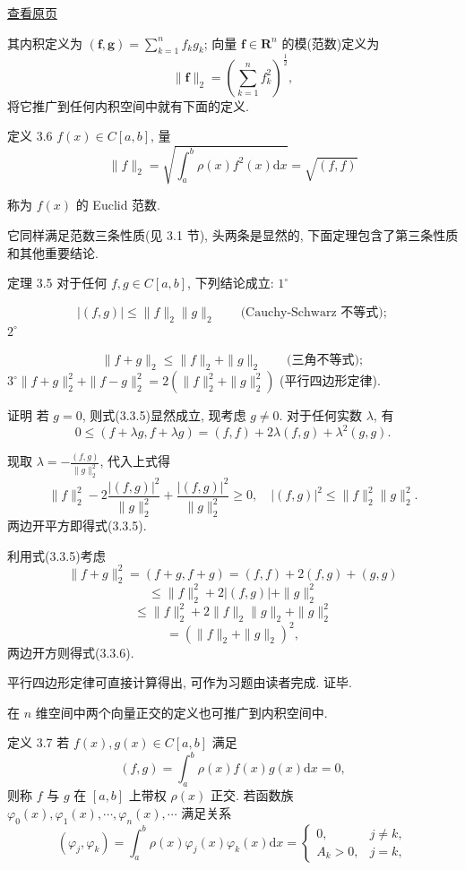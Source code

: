 \documentclass[
  10pt,
  fontset=fandol]{ctexart}
\begin{document}
\href{../../source-images/pdf-066.jpeg}{查看原页}

其内积定义为 \((\boldsymbol{f}, \boldsymbol{g}) = \sum_{k=1}^{n} f_{k} g_{k}\); 向量 \(\boldsymbol{f} \in \mathbf{R}^{n}\) 的模(范数)定义为 \[
\| \boldsymbol{f} \|_{2} = \left( \sum_{k=1}^{n} f_{k}^{2} \right)^{\frac{1}{2}},
\] 将它推广到任何内积空间中就有下面的定义.

定义 3.6 \(f(x) \in C[a, b]\), 量 \[
\| f \|_{2} = \sqrt{\int_{a}^{b} \rho(x) f^{2}(x) \mathrm{d}x} = \sqrt{(f, f)} \tag{3.3.4}
\]

称为 \(f(x)\) 的 Euclid 范数.

它同样满足范数三条性质(见 3.1 节), 头两条是显然的, 下面定理包含了第三条性质和其他重要结论.

定理 3.5 对于任何 \(f, g \in C[a, b]\), 下列结论成立: \(1^{\circ}\)

\[
|(f,g)|\leqslant\|f\|_2\|g\|_2\qquad\text{(Cauchy-Schwarz 不等式)};\tag{3.3.5}
\] \(2^{\circ}\)

\[
\|f+g\|_2\leqslant\|f\|_2+\|g\|_2\qquad\text{(三角不等式)};\tag{3.3.6}
\] \(3^{\circ} \| f + g \|_{2}^{2} + \| f - g \|_{2}^{2} = 2(\| f \|_{2}^{2} + \| g \|_{2}^{2})\) (平行四边形定律).

证明 若 \(g=0\), 则式(3.3.5)显然成立, 现考虑 \(g \neq 0\). 对于任何实数 \(\lambda\), 有 \[
0 \leqslant (f + \lambda g, f + \lambda g) = (f, f) + 2\lambda(f, g) + \lambda^{2}(g, g).
\]

现取 \(\lambda = -\frac{(f, g)}{\| g \|_{2}^{2}}\), 代入上式得 \[
\| f \|_{2}^{2} - 2 \frac{|(f, g)|^{2}}{\| g \|_{2}^{2}} + \frac{|(f, g)|^{2}}{\| g \|_{2}^{2}} \geqslant 0, \quad |(f, g)|^{2} \leqslant \| f \|_{2}^{2} \| g \|_{2}^{2}.
\] 两边开平方即得式(3.3.5).

利用式(3.3.5)考虑 \[
\| f + g \|_{2}^{2} = (f + g, f + g) = (f, f) + 2(f, g) + (g, g)
\] \[
\leqslant \| f \|_{2}^{2} + 2 |(f, g)| + \| g \|_{2}^{2}
\] \[
\leqslant \| f \|_{2}^{2} + 2 \| f \|_{2} \| g \|_{2} + \| g \|_{2}^{2}
\] \[
= (\| f \|_{2} + \| g \|_{2})^{2},
\] 两边开方则得式(3.3.6).

平行四边形定律可直接计算得出, 可作为习题由读者完成. 证毕.

在 \(n\) 维空间中两个向量正交的定义也可推广到内积空间中.

定义 3.7 若 \(f(x), g(x) \in C[a, b]\) 满足 \[
(f, g) = \int_{a}^{b} \rho(x) f(x) g(x) \mathrm{d}x = 0, \tag{3.3.7}
\] 则称 \(f\) 与 \(g\) 在 \([a, b]\) 上带权 \(\rho(x)\) 正交. 若函数族 \(\varphi_{0}(x), \varphi_{1}(x), \cdots, \varphi_{n}(x), \cdots\) 满足关系 \[
(\varphi_{j}, \varphi_{k}) = \int_{a}^{b} \rho(x) \varphi_{j}(x) \varphi_{k}(x) \mathrm{d}x = \begin{cases} 0, & j \neq k, \\ A_{k} > 0, & j = k, \end{cases} \tag{3.3.8}
\]
\end{document}
